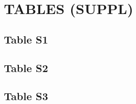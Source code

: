 \documentclass[
]{article}
\begin{document}
\clearpage

\hypertarget{tables-suppl}{%
\section{TABLES (SUPPL)}\label{tables-suppl}}

\hypertarget{table-s1}{%
\subsection{Table S1}\label{table-s1}}

\clearpage

\hypertarget{table-s2}{%
\subsection{Table S2}\label{table-s2}}

\clearpage

\hypertarget{table-s3}{%
\subsection{Table S3}\label{table-s3}}

\clearpage
\end{document}
